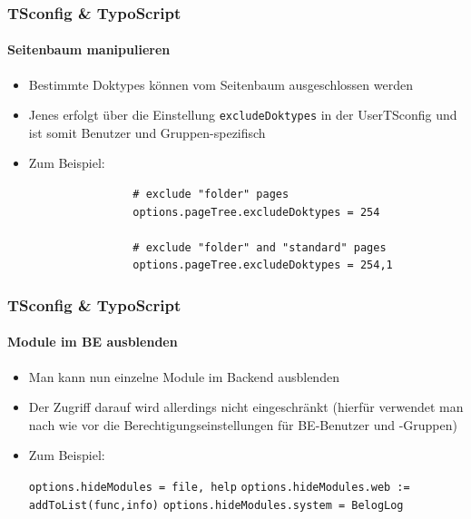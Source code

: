 
\begin{frame}[fragile]
	\frametitle{TSconfig \& TypoScript}
	\framesubtitle{Seitenbaum manipulieren}

	\begin{itemize}

		\item Bestimmte Doktypes können vom Seitenbaum ausgeschlossen werden
		\item Jenes erfolgt über die Einstellung \texttt{excludeDoktypes} in der UserTSconfig und ist somit Benutzer und Gruppen-spezifisch
		\item Zum Beispiel:

			\begin{lstlisting}
				# exclude "folder" pages
				options.pageTree.excludeDoktypes = 254

				# exclude "folder" and "standard" pages
				options.pageTree.excludeDoktypes = 254,1
			\end{lstlisting}

	\end{itemize}

\end{frame}


\begin{frame}[fragile]
	\frametitle{TSconfig \& TypoScript}
	\framesubtitle{Module im BE ausblenden}

	\begin{itemize}

		\item Man kann nun einzelne Module im Backend ausblenden
		\item Der Zugriff darauf wird allerdings nicht eingeschränkt\newline
			\small(hierfür verwendet man nach wie vor die Berechtigungseinstellungen für BE-Benutzer und -Gruppen)\normalsize
		\item Zum Beispiel:

			\lstinline!options.hideModules = file, help!
			\lstinline!options.hideModules.web := addToList(func,info)!
			\lstinline!options.hideModules.system = BelogLog!

	\end{itemize}

\end{frame}

